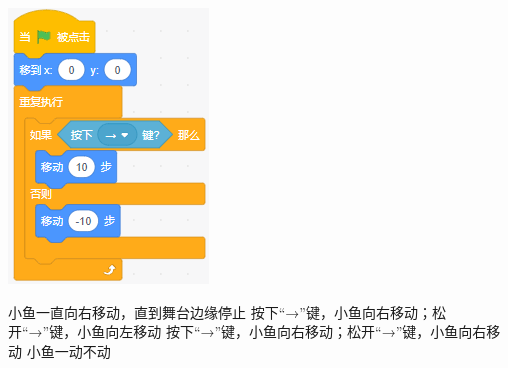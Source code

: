 \documentclass[10pt, a4paper]{article}
\begin{document}
\begin{enumerate}
\begin{minipage}{.13\textwidth}
            \includegraphics[width=\textwidth]{figure/22-2.png}
        \end{minipage}
        \begin{minipage}{.63\textwidth}
            \begin{tasks}
                \task 小鱼一直向右移动，直到舞台边缘停止
                \task 按下“→”键，小鱼向右移动；松开“→”键，小鱼向左移动
                \task 按下“→”键，小鱼向右移动；松开“→”键，小鱼向右移动
                \task 小鱼一动不动
            \end{tasks}
        \end{minipage}


\end{enumerate}
\end{document}

